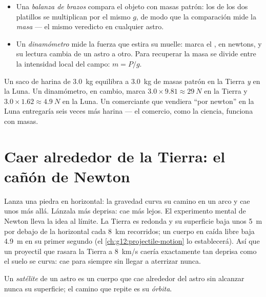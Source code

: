 \begin{method}\label{met:g10:universal-gravitation:instruments}
\begin{itemize}
  \item Una \emph{balanza de brazos} compara el objeto con masas patrón:
        los  de los dos platillos se multiplican por el mismo $g$,
        de modo que la comparación mide la \emph{masa} --- el mismo
        veredicto en cualquier astro.
  \item Un \emph{dinamómetro} mide la fuerza que estira su muelle: marca
        el \emph{}, en newtons, y su lectura cambia de un astro a
        otro. Para recuperar la masa se divide entre la intensidad local
        del campo: $m = P/g$.
\end{itemize}
\end{method}

\begin{example}\label{ex:g10:universal-gravitation:flour}
Un saco de harina de \qty{3.0}{kg} equilibra a \qty{3.0}{kg} de masas
patrón en la Tierra \emph{y} en la Luna. Un dinamómetro, en cambio,
marca $3.0 \times 9.81 \approx \qty{29}{N}$ en la Tierra y
$3.0 \times 1.62 \approx \qty{4.9}{N}$ en la Luna. Un comerciante que
vendiera ``por newton'' en la Luna entregaría seis veces más harina ---
el comercio, como la ciencia, funciona con masas.
\end{example}

\section{Caer alrededor de la Tierra: el cañón de Newton}

Lanza una piedra en horizontal: la gravedad curva su camino en un arco y
cae unos  más allá. Lánzala más deprisa: cae más lejos. El
experimento mental de Newton lleva la idea al límite. La Tierra es
redonda y su superficie baja unos \qty{5}{m} por debajo de la horizontal
cada \qty{8}{km} recorridos; un cuerpo en caída libre baja \qty{4.9}{m}
en su primer segundo (el \cref{ch:g12:projectile-motion} lo
establecerá). Así que un proyectil que rasara la Tierra a \qty{8}{km/s}
caería exactamente tan deprisa como el suelo se curva: cae para siempre
sin llegar a aterrizar nunca.

\begin{definition}\label{def:g10:universal-gravitation:satellite}
Un \emph{satélite} de un astro es un cuerpo que cae
alrededor del astro sin alcanzar nunca su superficie; el camino que
repite es su \emph{órbita}.
\end{definition}

